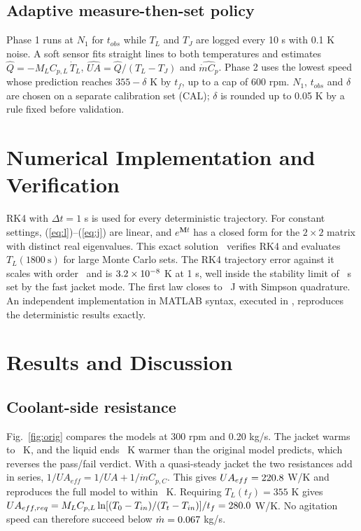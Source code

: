 \documentclass[conference,letterpaper]{IEEEtran}
\newcommand{\mdot}{\dot m}
\begin{document}
\subsection{Adaptive measure-then-set policy}
Phase 1 runs at \(N_1\) for \(t_{obs}\) while \(T_L\) and \(T_J\) are logged every 10 s with 0.1 K noise. A soft sensor fits straight lines to both temperatures and estimates \(\hat Q = -M_LC_{p,L}\,\dot T_L\), \(\widehat{UA} = \hat Q/(T_L - T_J)\) and \(\widehat{\mdot C_p}\). Phase 2 uses the lowest speed whose prediction reaches \(355 - \delta\) K by \(t_f\), up to a cap of 600 rpm. \(N_1\), \(t_{obs}\) and \(\delta\) are chosen on a separate calibration set (CAL); \(\delta\) is rounded up to 0.05 K by a rule fixed before validation.

\section{Numerical Implementation and Verification}
RK4 with \(\Delta t = 1\) s is used for every deterministic trajectory. For constant settings, (\ref{eq:l})--(\ref{eq:j}) are linear, and \(e^{\mathbf Mt}\) has a closed form for the \(2\times2\) matrix with distinct real eigenvalues. This exact solution~\cite{b6} verifies RK4 and evaluates \(T_L(1800\ \mathrm s)\) for large Monte Carlo sets. The RK4 trajectory error against it scales with order \vConvOrder\ and is \(3.2\times10^{-8}\) K at 1 s, well inside the stability limit of \vStabRec\ s set by the fast jacket mode. The first law closes to \vEBResSimp\ J with Simpson quadrature. An independent implementation in MATLAB syntax, executed in \vOctRuntime, reproduces the deterministic results exactly.

\section{Results and Discussion}
\subsection{Coolant-side resistance}
Fig.~\ref{fig:orig} compares the models at 300 rpm and 0.20 kg/s. The jacket warms to \vPeakTJBase\ K, and the liquid ends \vTBaseGap\ K warmer than the original model predicts, which reverses the pass/fail verdict. With a quasi-steady jacket the two resistances add in series, \(1/UA_{eff} = 1/UA + 1/\mdot C_{p,C}\). This gives \(UA_{eff} = 220.8\) W/K and reproduces the full model to within \vRomErrBase\ K. Requiring \(T_L(t_f) = 355\) K gives \(UA_{eff,req} = M_LC_{p,L}\ln[(T_0-T_{in})/(T_t-T_{in})]/t_f = 280.0\) W/K. No agitation speed can therefore succeed below \(\mdot = \vMinFlow\) kg/s.
\end{document}
